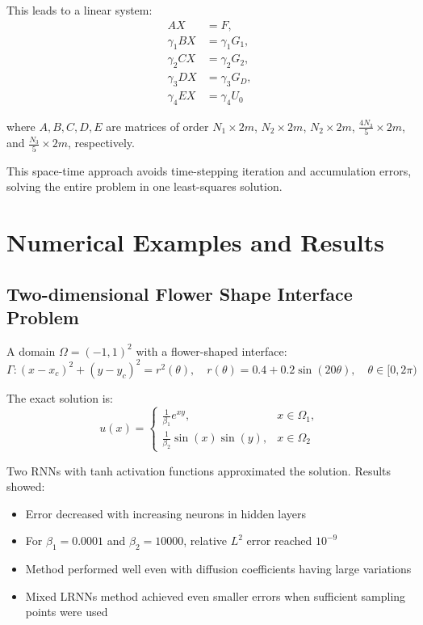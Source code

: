 \documentclass[11pt]{article}
\begin{document}
This leads to a linear system:
\begin{align}
AX &= F, \\
\gamma_1 BX &= \gamma_1 G_1, \\
\gamma_2 CX &= \gamma_2 G_2, \\
\gamma_3 DX &= \gamma_3 G_D, \\
\gamma_4 EX &= \gamma_4 U_0
\end{align}

where $A, B, C, D, E$ are matrices of order $N_1 \times 2m$, $N_2 \times 2m$, $N_2 \times 2m$, $\frac{4N_3}{5} \times 2m$, and $\frac{N_3}{5} \times 2m$, respectively.

This space-time approach avoids time-stepping iteration and accumulation errors, solving the entire problem in one least-squares solution.

\section{Numerical Examples and Results}

\subsection{Two-dimensional Flower Shape Interface Problem}
A domain $\Omega = (-1,1)^2$ with a flower-shaped interface:
\begin{equation}
\Gamma: (x-x_c)^2 + (y-y_c)^2 = r^2(\theta), \quad r(\theta) = 0.4 + 0.2\sin(20\theta), \quad \theta \in [0,2\pi)
\end{equation}

The exact solution is:
\begin{equation}
u(x) = 
\begin{cases}
\frac{1}{\beta_1}e^{xy}, & x \in \Omega_1, \\
\frac{1}{\beta_2}\sin(x)\sin(y), & x \in \Omega_2
\end{cases}
\end{equation}

Two RNNs with tanh activation functions approximated the solution. Results showed:
\begin{itemize}
    \item Error decreased with increasing neurons in hidden layers
    \item For $\beta_1 = 0.0001$ and $\beta_2 = 10000$, relative $L^2$ error reached $10^{-9}$
    \item Method performed well even with diffusion coefficients having large variations
    \item Mixed LRNNs method achieved even smaller errors when sufficient sampling points were used
\end{itemize}
\end{document}
